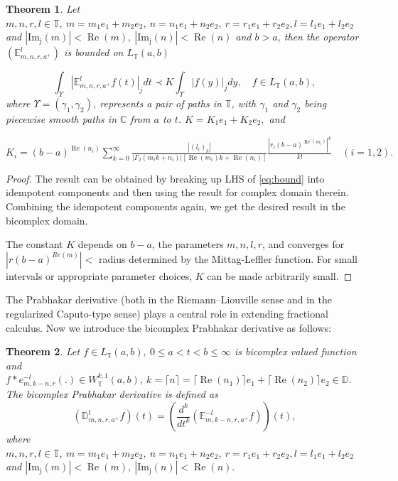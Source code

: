 \documentclass[a4paper,12pt]{article}
\newtheorem{theorem}{Theorem}[section]
\theoremstyle{remark}
\begin{document}
\begin{theorem}\label{th:bounded}
	Let $m,n,r,l \in \mathbb{T},~m= m_1e_1+m_2e_2,  ~ n=n_1e_1+n_2e_2,~ r=r_1e_1+r_2e_2,l=l_1e_1+l_2e_2$ and $|\operatorname{Im_j}(m)|<\operatorname{Re}(m),~|\operatorname{Im_j}(n)|<\operatorname{Re}(n)$  and $b > a$, then the operator 
$	(\mathbb{E}_{m,n,r,a^+}^l)$ 	is bounded on $L_{\mathbb{T}}(a, b)$ 

\begin{equation}\label{eq:bound}
\int_{\varUpsilon}\left| \mathbb{E}_{m,n,r,a^+}^lf(t)\right|_jdt \prec K\int_{\varUpsilon}\left|f(y)\right|_jdy,\quad f \in L_{\mathbb{T}}(a,b),
\end{equation}
  	where $\varUpsilon =(\gamma_1, \gamma_2)$, represents a pair of paths in \(\mathbb{T}\), with \(\gamma_1\) and \(\gamma_2\) being piecewise smooth paths in \(\mathbb{C}\) from \(a\) to \(t\).  $ K=K_1e_1+K_2e_2,$ and

$\displaystyle K_i=(b-a)^{\operatorname{Re}(n_i)}\sum_{k=0}^{\infty}\tfrac{|(l_i)_k|}{|\Gamma_2(m_i k+n_i )|[\operatorname{Re}(m_i) k+\operatorname{Re}(n_i)]}\frac{|r_i (b-a)^{\operatorname{Re}(m_i)}|^k}{k!}\quad  (i=1,2).$
\end{theorem}
\begin{proof}
The result can be obtained by breaking up LHS of \eqref{eq:bound} into idempotent components and then using the result \cite[p.40]{kilbas2004generalized} for
complex domain therein. Combining the idempotent components again, we get the desired
 result in the bicomplex domain.

The constant $K$ depends on $b-a$, the parameters $m, n, l, r$,  
and converges for $|r(b-a)^{Re(m)}| <$ radius determined by the Mittag-Leffler function.  
For small intervals or appropriate parameter choices, $K$ can be made arbitrarily small.
\end{proof}
\noindent The Prabhakar derivative (both in the Riemann–Liouville sense and in the regularized Caputo-type sense) plays a central role in extending fractional calculus. Now we introduce the bicomplex Prabhakar derivative as follows:
\begin{theorem}
	Let $f\in L_{\mathbb{T}}(a,b),~0\le a<t<b\le\infty$ is bicomplex valued function and $ f*e^{-l}_{m,k-n,r}(.)\in W_{\mathbb{T}}^{k,1}(a,b),~k=\lceil n \rceil=\lceil\operatorname{Re} (n_1)\rceil e_1+\lceil \operatorname{Re}(n_2)\rceil e_2\in \mathbb{D}.$ The  bicomplex Prabhakar derivative  is defined as 
	\begin{equation}\label{eq:bc prabhakar der}
	(\mathbb{D}_{m,n,r,a^+}^l f)(t)=\left(\frac{d^k}{dt^k}(\mathbb{E}_{m,k-n,r,a^+}^{-l}f) \right) (t),
	\end{equation}
	where $m,n,r,l \in \mathbb{T},~m= m_1e_1+m_2e_2,  ~ n=n_1e_1+n_2e_2,~ r=r_1e_1+r_2e_2,l=l_1e_1+l_2e_2$ and $|\operatorname{Im_j}(m)|<\operatorname{Re}(m),~|\operatorname{Im_j}(n)|<\operatorname{Re}(n).$
	
\end{theorem}
\end{document}
